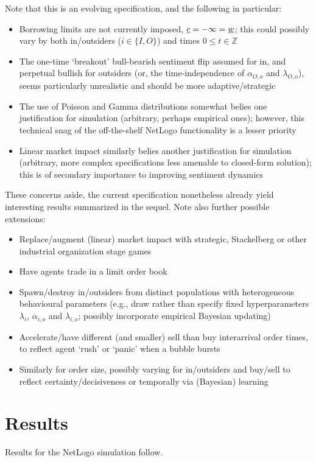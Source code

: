 \documentclass{article}
\begin{document}
Note that this is an evolving specification, and the following in particular:
\begin{itemize}
    \item Borrowing limits are not currently imposed, $\uline c=-\infty=\uline w$; this could possibly vary by both in/outsiders ($i\in\{I,O\}$) and times $0\le t\in\mathbb Z$
    \item The one-time `breakout' bull-bearish sentiment flip assumed for in, and perpetual bullish for outsiders (or, the time-independence of $\alpha_{O,o}$ and $\lambda_{O,o}$), seems particularly unrealistic and should be more adaptive/strategic
    \item The use of Poisson and Gamma distributions somewhat belies one justification for simulation (arbitrary, perhaps empirical ones); however, this technical snag of the off-the-shelf NetLogo functionality is a lesser priority
    \item Linear market impact similarly belies another justification for simulation (arbitrary, more complex specifications less amenable to closed-form solution); this is of secondary importance to improving sentiment dynamics
\end{itemize}
These concerns aside, the current specification nonetheless already yield interesting results summarized in the sequel.  Note also further possible extensions:
\begin{itemize}
\item Replace/augment (linear) market impact with strategic, Stackelberg or other industrial organization stage games
\item Have agents trade in a limit order book
\item Spawn/destroy in/outsiders from distinct populations with heterogeneous behavioural parameters (e.g., draw rather than specify fixed hyperparameters $\lambda_{i}$, $\alpha_{i,o}$ and $\lambda_{i,o}$; possibly incorporate empirical Bayesian updating)
\item Accelerate/have different (and smaller) sell than buy interarrival order times, to reflect agent `rush' or `panic' when a bubble bursts
\item Similarly for order size, possibly varying for in/outsiders and buy/sell to reflect certainty/decisiveness or temporally via (Bayesian) learning
\end{itemize}
\section{Results}
Results for the NetLogo simulation follow.
\end{document}
